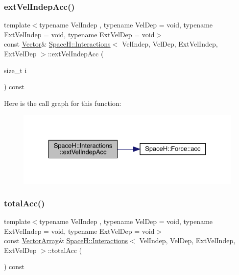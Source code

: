 \subsubsection{\texorpdfstring{ext\+Vel\+Indep\+Acc()}{extVelIndepAcc()}\hspace{0.1cm}{\footnotesize\ttfamily [2/2]}}
{\footnotesize\ttfamily template$<$typename Vel\+Indep , typename Vel\+Dep  = void, typename Ext\+Vel\+Indep  = void, typename Ext\+Vel\+Dep  = void$>$ \\
const \mbox{\hyperlink{class_space_h_1_1_interactions_aaebe228fb44635e85cdb8cc9c10d30d1}{Vector}}\& \mbox{\hyperlink{class_space_h_1_1_interactions}{Space\+H\+::\+Interactions}}$<$ Vel\+Indep, Vel\+Dep, Ext\+Vel\+Indep, Ext\+Vel\+Dep $>$\+::ext\+Vel\+Indep\+Acc (\begin{DoxyParamCaption}\item[{size\+\_\+t}]{i }\end{DoxyParamCaption}) const\hspace{0.3cm}{\ttfamily [inline]}}

Here is the call graph for this function\+:
\nopagebreak
\begin{figure}[H]
\begin{center}
\leavevmode
\includegraphics[width=329pt]{class_space_h_1_1_interactions_ad2b05f1d0f50c5136aa5e437fd8e6226_cgraph}
\end{center}
\end{figure}
\mbox{\label{class_space_h_1_1_interactions_a77d514a1346180fd39679352cd4de5ed}} 
\subsubsection{\texorpdfstring{total\+Acc()}{totalAcc()}\hspace{0.1cm}{\footnotesize\ttfamily [1/2]}}
{\footnotesize\ttfamily template$<$typename Vel\+Indep , typename Vel\+Dep  = void, typename Ext\+Vel\+Indep  = void, typename Ext\+Vel\+Dep  = void$>$ \\
const \mbox{\hyperlink{class_space_h_1_1_interactions_ac9d9b24b469c4be73b96ce0f09f93fcf}{Vector\+Array}}\& \mbox{\hyperlink{class_space_h_1_1_interactions}{Space\+H\+::\+Interactions}}$<$ Vel\+Indep, Vel\+Dep, Ext\+Vel\+Indep, Ext\+Vel\+Dep $>$\+::total\+Acc (\begin{DoxyParamCaption}{ }\end{DoxyParamCaption}) const\hspace{0.3cm}{\ttfamily [inline]}}


